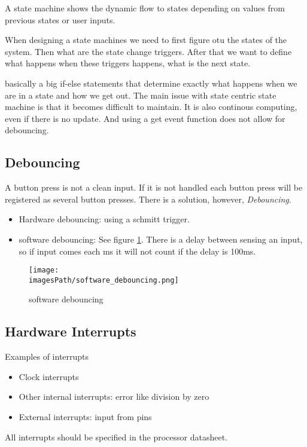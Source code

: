  A state machine shows the dynamic flow to states depending on values from previous states or user inputs.

When designing a state machines we need to first figure otu the 
states of the system. Then what are the state change triggers.
After that we want to define what happens when these triggers happens,
what is the next state.

 basically a big if-else statements 
that determine exactly what happens when we are in a state and how we get out.
The main issue with state centric state machine is that it becomes difficult to maintain. 
It is also continous computing, even if there is no update.
And using a get event function does not allow for debouncing.

\subsection{Debouncing}
A button press is not a clean input. If it is not handled each button press will be registered as several button presses.
There is a solution, however, \textit{Debouncing}.
\begin{itemize}
    \item Hardware debouncing: using a schmitt trigger.
    \item software debouncing: See figure \ref{fig:software_debouncing}. There is a delay between sensing an input, so if input comes each ms it will not count if the delay is 100ms.
\end{itemize}

\begin{figure}[H]
    \centering
    \texttt{[image: \\imagesPath/software\_debouncing.png]}
    \caption{software debouncing}
    \label{fig:software_debouncing}
\end{figure}


\subsection{Hardware Interrupts}
Examples of interrupts
\begin{itemize}
    \item Clock interrupts
    \item Other internal interrupts: error like division by zero
    \item External interrupts: input from pins
\end{itemize}
All interrupts should be specified in the processor datasheet.

